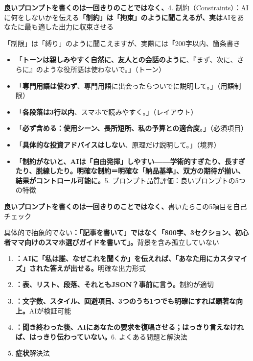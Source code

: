 \textbf{良いプロンプトを書くのは一回きりのことではなく、}4. 制約（Constraints）：AIに何をしないかを伝える\textbf{「制約」は「拘束」のように聞こえるが、実は}AIをあなたに最も適した出力に収束させる


「制限」は「縛り」のように聞こえますが、実際には\textbf{「}200字以内、箇条書き


\begin{itemize}
  \item 「\textbf{トーンは親しみやすく自然に、友人との会話のように}、『まず、次に、さらに』のような役所語は使わないで。」（トーン）
  \item 「\textbf{専門用語は使わず}、専門用語に出会ったらついでに説明して。」（用語制限）
  \item 「\textbf{各段落は3行以内}、スマホで読みやすく。」（レイアウト）
  \item 「\textbf{必ず含める：使用シーン、長所短所、私の予算との適合度}。」（必須項目）
  \item 「\textbf{具体的な投資アドバイスはしない}、原理だけ説明して。」（境界）
  \item 「\textbf{制約がないと、AIは「自由発揮」しやすい——学術的すぎたり、長すぎたり、脱線したり。明確な制約＝明確な「納品基準」、双方の期待が揃い、結果がコントロール可能に。}5. プロンプト品質評価：良いプロンプトの5つの特徴
\end{itemize}

\textbf{良いプロンプトを書くのは一回きりのことではなく、}書いたらこの5項目を自己チェック


具体的で抽象的でない\textbf{：「記事を書いて」ではなく「800字、3セクション、初心者ママ向けのスマホ選びガイドを書いて」。}背景を含み孤立していない

\begin{enumerate}
  \item \textbf{：AIに「私は誰、なぜこれを聞くか」を伝えれば、「あなた用にカスタマイズ」された答えが出せる。}明確な出力形式
  \item \textbf{：表、リスト、段落、それともJSON？事前に言う。}制約が適切
  \item \textbf{：文字数、スタイル、回避項目、3つのうち1つでも明確にすれば顕著な向上。}AIが検証可能
  \item \textbf{：聞き終わった後、AIにあなたの要求を復唱させる；はっきり言えなければ、はっきり伝わっていない。}6. よくある問題と解決法
  \item \textbf{症状}解決法
\end{enumerate}

